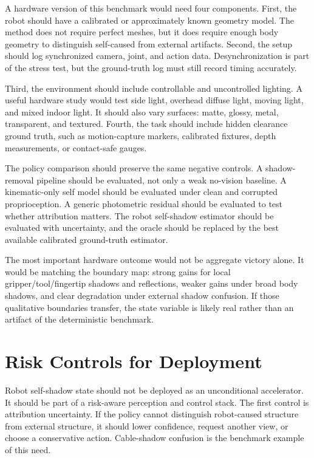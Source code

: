 \documentclass{article}
\begin{document}
A hardware version of this benchmark would need four components. First, the robot should have a calibrated or approximately known geometry model. The method does not require perfect meshes, but it does require enough body geometry to distinguish self-caused from external artifacts. Second, the setup should log synchronized camera, joint, and action data. Desynchronization is part of the stress test, but the ground-truth log must still record timing accurately.

Third, the environment should include controllable and uncontrolled lighting. A useful hardware study would test side light, overhead diffuse light, moving light, and mixed indoor light. It should also vary surfaces: matte, glossy, metal, transparent, and textured. Fourth, the task should include hidden clearance ground truth, such as motion-capture markers, calibrated fixtures, depth measurements, or contact-safe gauges.

The policy comparison should preserve the same negative controls. A shadow-removal pipeline should be evaluated, not only a weak no-vision baseline. A kinematic-only self model should be evaluated under clean and corrupted proprioception. A generic photometric residual should be evaluated to test whether attribution matters. The robot self-shadow estimator should be evaluated with uncertainty, and the oracle should be replaced by the best available calibrated ground-truth estimator.

The most important hardware outcome would not be aggregate victory alone. It would be matching the boundary map: strong gains for local gripper/tool/fingertip shadows and reflections, weaker gains under broad body shadows, and clear degradation under external shadow confusion. If those qualitative boundaries transfer, the state variable is likely real rather than an artifact of the deterministic benchmark.

\clearpage
\section{Risk Controls for Deployment}

Robot self-shadow state should not be deployed as an unconditional accelerator. It should be part of a risk-aware perception and control stack. The first control is attribution uncertainty. If the policy cannot distinguish robot-caused structure from external structure, it should lower confidence, request another view, or choose a conservative action. Cable-shadow confusion is the benchmark example of this need.
\end{document}

